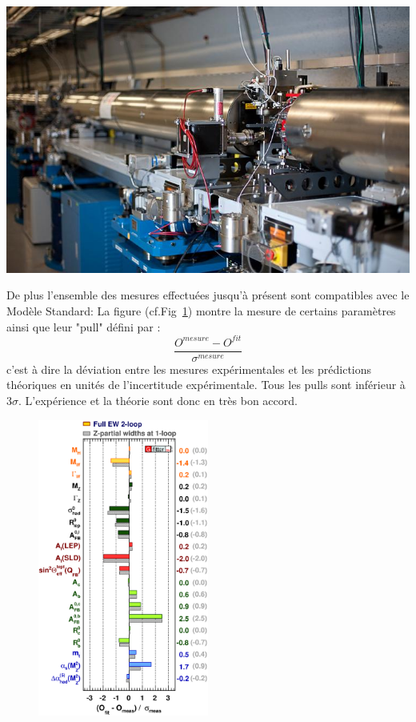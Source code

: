 \marginpar
{
	\centering
	\includegraphics[width=\marginparwidth]{SM/slac.jpg}
	\label{SLAC}
}

De plus l'ensemble des mesures effectuées jusqu'à présent sont compatibles avec le Modèle Standard: La figure (cf.Fig~\ref{mesures}) montre la mesure de certains paramètres ainsi que leur "pull" défini par :
\begin{equation}
\frac{O^{mesure}-O^{fit}}{\sigma^{mesure}}
\end{equation}
c'est à dire la déviation entre les mesures expérimentales et les prédictions théoriques en unités de l'incertitude expérimentale. Tous les pulls sont inférieur à \num{3}$\sigma$. L'expérience et la théorie sont donc en très bon accord.

\begin{figure}[ht!]
\centering
\includegraphics[width=0.50\textwidth]{SM/mesure.eps}
\label{mesures}
\end{figure}

